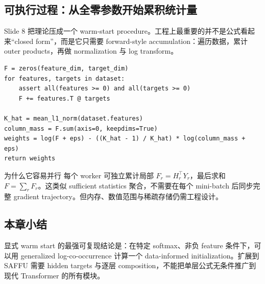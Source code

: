 \subsection{可执行过程：从全零参数开始累积统计量}

Slide 8 把理论压成一个 warm-start procedure。工程上最重要的并不是公式看起来“closed form”，而是它只需要 forward-style accumulation：遍历数据，累计 outer products，再做 normalization 与 log transform。


\begin{lstlisting}[caption={Softmax layer 显式 warm start 的 shape-first 伪代码}]
F = zeros(feature_dim, target_dim)
for features, targets in dataset:
    assert all(features >= 0) and all(targets >= 0)
    F += features.T @ targets

K_hat = mean_l1_norm(dataset.features)
column_mass = F.sum(axis=0, keepdims=True)
weights = log(F + eps) - ((K_hat - 1) / K_hat) * log(column_mass + eps)
return weights
\end{lstlisting}

\begin{knowledgebox}{为什么它容易并行}
每个 worker 可独立累计局部 $F_r=H_r^\top Y_r$，最后求和 $F=\sum_rF_r$。这类似 sufficient statistics 聚合，不需要在每个 mini-batch 后同步完整 gradient trajectory。但内存、数值范围与稀疏存储仍需工程设计。
\end{knowledgebox}


\subsection{本章小结}

显式 warm start 的最强可复现结论是：在特定 softmax、非负 feature 条件下，可以用 generalized log-co-occurrence 计算一个 data-informed initialization。扩展到 SAFFU 需要 hidden targets 与逐层 composition，不能把单层公式无条件推广到现代 Transformer 的所有模块。

